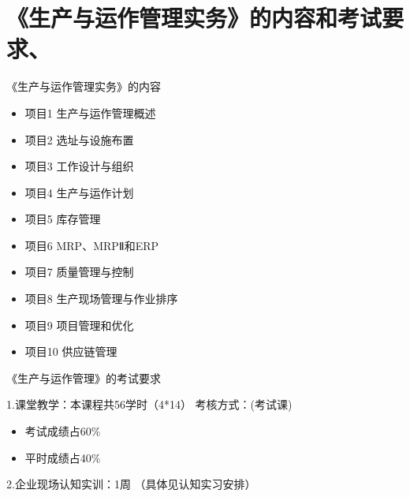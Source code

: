 \documentclass[11pt]{beamer}
\begin{document}
	\section{《生产与运作管理实务》的内容和考试要求、}
	\begin{frame}{《生产与运作管理实务》的内容}
		\begin{itemize}
			\item 项目1  生产与运作管理概述
			\item 项目2  选址与设施布置
			\item 项目3  工作设计与组织
			\item 项目4  生产与运作计划
			\item 项目5  库存管理
			\item 项目6  MRP、MRPⅡ和ERP
			\item 项目7  质量管理与控制
			\item 项目8  生产现场管理与作业排序
			\item 项目9  项目管理和优化 
			\item 项目10  供应链管理
		\end{itemize}
	\end{frame}
	
	
	\begin{frame}{《生产与运作管理》的考试要求}
		\begin{block}{1.课堂教学：本课程共56学时（4*14）}
			\noindent 考核方式：(考试课)
			\begin{itemize}
				\item 考试成绩占60\%
				\item 平时成绩占40\%
			\end{itemize}			  
		\end{block}	
		\begin{block}{2.企业现场认知实训：1周}
			（具体见认知实习安排） 
		\end{block}	
	\end{frame}
\end{document}
